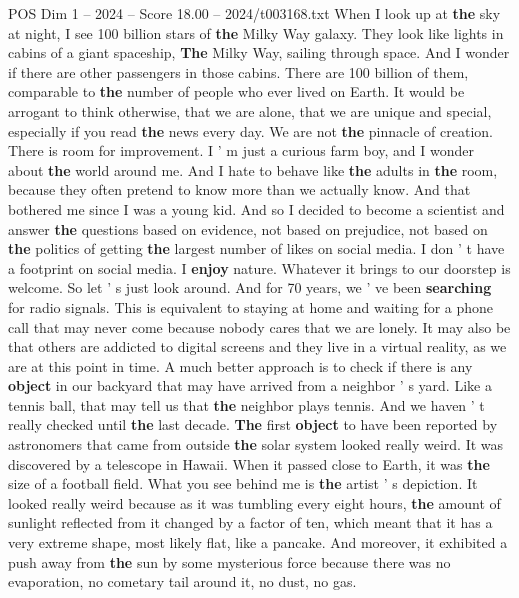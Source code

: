 \begin{textsample}{POS Dim 1 – 2024 – Score 18.00 – 2024/t003168.txt}  \label{ex:f1_pos_050}
When I look up at \textbf{the} sky at night, I see 100 billion stars of \textbf{the} Milky Way galaxy.
They look like lights in cabins of a giant spaceship, \textbf{The} Milky Way, sailing through space.
And I wonder if there are other passengers in those cabins.
There are 100 billion of them, comparable to \textbf{the} number of people who ever lived on Earth.
It would be arrogant to think otherwise, that we are alone, that we are unique and special, especially if you read \textbf{the} news every day.
We are not \textbf{the} pinnacle of creation.
There is room for improvement.
I ' m just a curious farm boy, and I wonder about \textbf{the} world around me.
And I hate to behave like \textbf{the} adults in \textbf{the} room, because they often pretend to know more than we actually know.
And that bothered me since I was a young kid.
And so I decided to become a scientist and answer \textbf{the} questions based on evidence, not based on prejudice, not based on \textbf{the} politics of getting \textbf{the} largest number of likes on social media.
I don ' t have a footprint on social media.
I \textbf{enjoy} nature.
Whatever it brings to our doorstep is welcome.
So let ' s just look around.
And for 70 years, we ' ve been \textbf{searching} for radio signals.
This is equivalent to staying at home and waiting for a phone call that may never come because nobody cares that we are lonely.
It may also be that others are addicted to digital screens and they live in a virtual reality, as we are at this point in time.
A much better approach is to check if there is any \textbf{object} in our backyard that may have arrived from a neighbor ' s yard.
Like a tennis ball, that may tell us that \textbf{the} neighbor plays tennis.
And we haven ' t really checked until \textbf{the} last decade. \textbf{The} first \textbf{object} to have been reported by astronomers that came from outside \textbf{the} solar system looked really weird.
It was discovered by a telescope in Hawaii.
When it passed close to Earth, it was \textbf{the} size of a football field.
What you see behind me is \textbf{the} artist ' s depiction.
It looked really weird because as it was tumbling every eight hours, \textbf{the} amount of sunlight reflected from it changed by a factor of ten, which meant that it has a very extreme shape, most likely flat, like a pancake.
And moreover, it exhibited a push away from \textbf{the} sun by some mysterious force because there was no evaporation, no cometary tail around it, no dust, no gas.

\end{textsample}
